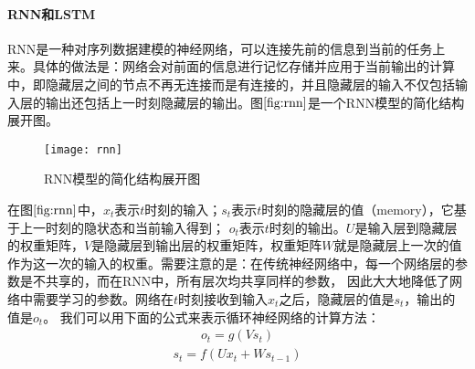  \paragraph{RNN和LSTM}
RNN是一种对序列数据建模的神经网络，可以连接先前的信息到当前的任务上来。具体的做法是：网络会对前面的信息进行记忆存储并应用于当前输出的计算中，即隐藏层之间的节点不再无连接而是有连接的，并且隐藏层的输入不仅包括输入层的输出还包括上一时刻隐藏层的输出。图$\ref{fig:rnn}$是一个RNN模型的简化结构展开图。
\begin{figure}[htbp]
\centering
\texttt{[image: rnn]}
\caption{RNN模型的简化结构展开图}
\label{fig:rnn}
\end{figure}

在图$\ref{fig:rnn}$中，$x_{t}$表示$t$时刻的输入；$s_{t}$表示$t$时刻的隐藏层的值（memory），它基于上一时刻的隐状态和当前输入得到；
$o_{t}$表示$t$时刻的输出。$U$是输入层到隐藏层的权重矩阵，$V$是隐藏层到输出层的权重矩阵，权重矩阵$W$就是隐藏层上一次的值作为这一次的输入的权重。需要注意的是：在传统神经网络中，每一个网络层的参数是不共享的，而在RNN中，所有层次均共享同样的参数，
因此大大地降低了网络中需要学习的参数。网络在$t$时刻接收到输入$x_{t}$之后，隐藏层的值是$s_{t}$，输出的值是$o_{t}$。
我们可以用下面的公式来表示循环神经网络的计算方法：
\begin{equation}
\label{rnn_1}
\begin{aligned}
o_{t}=g(V s_{t})
\end{aligned}
\end{equation}
\begin{equation}
\label{rnn_2}
\begin{aligned}
s_{t}=f(U x_{t}+W s_{t-1})
\end{aligned}
\end{equation}


